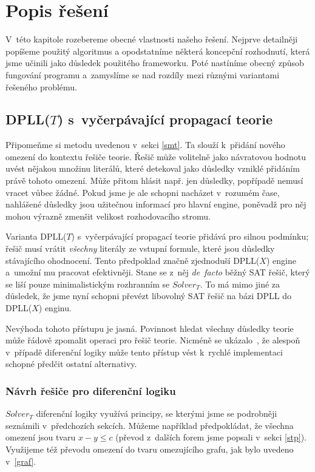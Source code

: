 \chapter{Popis řešení}

V~této kapitole rozebereme obecné vlastnosti našeho řešení. Nejprve detailněji popíšeme použitý algoritmus a opodstatníme některá koncepční rozhodnutí, která jsme učinili jako důsledek použitého frameworku. Poté nastíníme obecný způsob fungování programu a~zamyslíme se nad rozdíly mezi různými variantami řešeného problému.

\section{DPLL($T$) s~vyčerpávající propagací teorie}

Připomeňme si metodu  uvedenou v~sekci \ref{smt}. Ta slouží k~přidání nového omezení do kontextu řešiče teorie. Řešič může volitelně jako návratovou hodnotu uvést nějakou množinu literálů, které detekoval jako důsledky vzniklé přidáním právě tohoto omezení. Může přitom hlásit např. jen  důsledky, popřípadě nemusí vracet vůbec žádné. Pokud jsme je ale schopni nacházet v~rozumém čase, nahlášené důsledky jsou užitečnou informací pro hlavní engine, poněvadž pro něj mohou výrazně zmenšit velikost rozhodovacího stromu.

Varianta DPLL($T$) s~vyčerpávající propagací teorie přidává pro  silnou podmínku; řešič musí vrátit \emph{všechny} literály ze vstupní formule, které jsou důsledky stávajícího ohodnocení. Tento předpoklad značně zjednoduší DPLL($X$) engine a~umožní mu pracovat efektivněji. Stane se z~něj \emph{de~facto} běžný SAT řešič, který se liší pouze minimalistickým rozhranním se $Solver_T$. To má mimo jiné za důsledek, že jsme nyní schopni převézt libovolný SAT řešič na bázi DPLL do DPLL($X$) enginu.

Nevýhoda tohoto přístupu je jasná. Povinnost hledat všechny důsledky teorie může řádově zpomalit operaci  pro řešič teorie. Nicméně se ukázalo~\cite{Nieuwenhuis05}, že alespoň v~případě diferenční logiky může tento přístup vést k~rychlé implementaci schopné předčit ostatní alternativy.

\subsection{Návrh řešiče pro diferenční logiku}

$Solver_T$ diferenční logiky využívá principy, se kterými jsme se podrobněji seznámili v~předchozích sekcích. Můžeme například předpokládat, že všechna omezení jsou tvaru $x-y \leq c$ (převod z~dalších forem jsme popsali v~sekci \ref{stp}). Využijeme též převodu omezení do tvaru omezujícího grafu, jak bylo uvedeno v~\ref{graf}.

